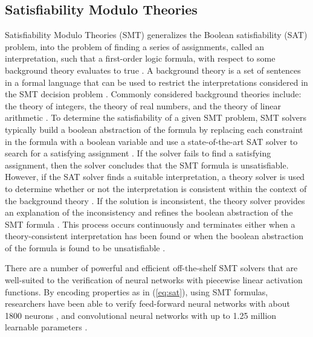 \documentclass[10pt,conference]{IEEEtran}
\begin{document}
\subsection{Satisfiability Modulo Theories} 
Satisfiability Modulo Theories (SMT) generalizes the Boolean satisfiability (SAT) problem, into the problem of finding a series of assignments, called an interpretation, such that a first-order logic formula, with respect to some background theory evaluates to true \cite{LeofanteAdvances2018}. A background theory is a set of sentences in a formal language that can be used to restrict the interpretations considered in the SMT decision problem \cite{BarettSMT}. Commonly considered background theories include: the theory of integers, the theory of real numbers, and the theory of linear arithmetic \cite{KuperScalableVerification2018}. To determine the satisfiability of a given SMT problem, SMT solvers typically build a boolean abstraction of the formula by replacing each constraint in the formula with a boolean variable and use a state-of-the-art SAT solver to search for a satisfying assignment \cite{LeofanteAdvances2018}. If the solver fails to find a satisfying assignment, then the solver concludes that the SMT formula is unsatisfiable. However, if the SAT solver finds a suitable interpretation, a theory solver is used to determine whether or not the interpretation is consistent within the context of the background theory \cite{BarettSMT}. If the solution is inconsistent, the theory solver provides an explanation of the inconsistency and refines the boolean abstraction of the SMT formula \cite{LeofanteAdvances2018}. This process occurs continuously and terminates either when a theory-consistent interpretation has been found or when the boolean abstraction of the formula is found to be unsatisfiable \cite{LeofanteAdvances2018}. 

There are a number of powerful and efficient off-the-shelf SMT solvers \cite{BarettSMT} that are well-suited to the verification of neural networks with piecewise linear activation functions. By encoding properties as in (\ref{eq:sat}), using SMT formulas, researchers have been able to verify feed-forward neural networks with about 1800 neurons \cite{KatzReluplex2017}, and convolutional neural networks with up to 1.25 million learnable parameters \cite{HuangSafetyVerification2016}. %
\vspace{-0.2 cm}
\end{document}
